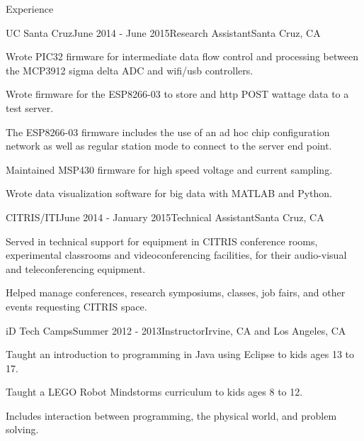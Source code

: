 \documentclass{resume} %
\begin{document}
\begin{rSection}{Experience}

\begin{rSubsection}{UC Santa Cruz}{June 2014 - June 2015}{Research Assistant}{Santa Cruz, CA}
\item Wrote PIC32 firmware for intermediate data flow control and processing between the MCP3912 sigma delta ADC and wifi/usb controllers.
\item Wrote firmware for the ESP8266-03 to store and http POST wattage data to a test server.
\item The ESP8266-03 firmware includes the use of an ad hoc chip configuration network as well as regular station mode to connect to the server end point.
\item Maintained MSP430 firmware for high speed voltage and current sampling.
\item Wrote data visualization software for big data with MATLAB and Python.
\end{rSubsection}


\begin{rSubsection}{CITRIS/ITI}{June 2014 - January 2015}{Technical Assistant}{Santa Cruz, CA}
\item Served in technical support for equipment in CITRIS conference rooms, experimental classrooms and videoconferencing facilities, for their audio-visual and teleconferencing equipment.
\item Helped manage conferences, research symposiums, classes, job fairs, and other events requesting CITRIS space.
\end{rSubsection}


\begin{rSubsection}{iD Tech Camps}{Summer 2012 - 2013}{Instructor}{Irvine, CA and Los Angeles, CA}
\item Taught an introduction to programming in Java using Eclipse to kids ages 13 to 17.
\item Taught a LEGO Robot Mindstorms curriculum to kids ages 8 to 12.
\item Includes interaction between programming, the physical world, and problem solving.
\end{rSubsection}

\end{rSection}


\clearpage %
\end{document}
